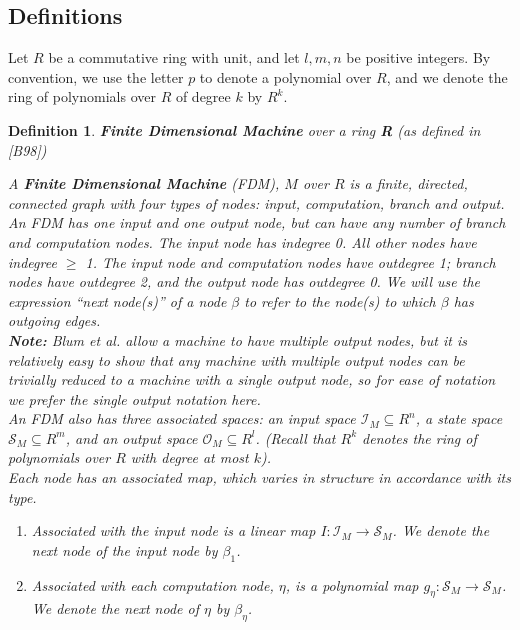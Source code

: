 \documentclass[twoside]{article}
\newcommand{\functype}[3]{$#1:#2 \rightarrow #3$}
\newcommand{\inspace}[0]{\mathcal{I}}
\newcommand{\outspace}[0]{\mathcal{O}}
\newcommand{\statespace}[0]{\mathcal{S}}
\newcommand{\note}[1]{{\textbf{Note:} #1}}
\renewcommand{\cite}[1]{[#1]}
\newtheorem{definition}{Definition}[section]
\begin{document}
\subsection{Definitions}

Let $R$ be a commutative ring with unit, and let $l, m, n$ be positive
integers.  By convention, we use the letter $p$ to denote a polynomial
over $R$, and we denote the ring of polynomials over $R$ of degree $k$
by $R^k$. 

\begin{definition}{\textbf{Finite Dimensional Machine} over a ring
    \textbf{R} (as defined in \cite{B98})}
  
  A \textbf{Finite Dimensional Machine} (FDM), $M$ over $R$ is a
  finite, directed, connected graph with four types of nodes:
  \emph{input, computation, branch} and \emph{output}.  An FDM has one
  input and one output node, but can have any number of branch and
  computation nodes. The input node has indegree 0.  All other nodes
  have indegree $\geq$ 1. The input node and computation nodes have
  outdegree 1; branch nodes have outdegree 2, and the output node has
  outdegree 0.  We will use the expression ``next node(s)'' of a node
  $\beta$ to refer to the node(s) to which $\beta$ has outgoing edges.\\
  
  \emph{\note{Blum et al. allow a machine to have multiple
      output nodes, but it is relatively easy to show that any machine
      with multiple output nodes can be trivially reduced to a machine
      with a single output node, so for ease of notation we
      prefer the single output notation here.}}\\
  
  An FDM also has three associated spaces: an input space $\inspace_M
  \subseteq R^n$, a state space $\statespace_M \subseteq R^m$, and an
  output space $\outspace_M \subseteq R^l$.  (Recall that $R^k$
  denotes the ring of polynomials over $R$ with degree at most $k$).\\
  
  Each node has an associated map, which varies in structure in
  accordance with its type.
  \begin{enumerate}
  \item Associated with the input node is a linear map
    \functype{I}{\inspace_M}{\statespace_M}. We denote the next node
    of the input node by $\beta_1$.
    
  \item Associated with each computation node, $\eta$, is a polynomial
    map \functype{g_\eta}{\statespace_M}{\statespace_M}. We denote the
    next node of $\eta$ by $\beta_\eta$.
    

\end{enumerate}
\end{definition}
\end{document}
